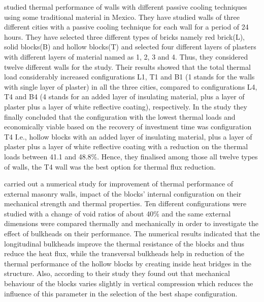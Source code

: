 \documentclass{article}
\begin{document}
\begin{multicols}{2}
\textcite{uriarte2019thermal} studied thermal performance of walls with different passive cooling techniques using some traditional material in Mexico. They have studied walls of three different cities with a passive cooling technique for each wall for a period of 24 hours. They have selected three different types of bricks namely red brick(L), solid blocks(B) and hollow blocks(T) and selected four different layers of plasters with different layers of material named as 1, 2, 3 and 4. Thus, they considered twelve different walls for the study. Their results showed that the total thermal load considerably increased configurations L1, T1 and B1 (1 stands for the walls with single layer of plaster) in all the three cities, compared to configurations L4, T4 and B4 (4 stands for an added layer of insulating material, plus a layer of plaster plus a layer of white reflective coating), respectively. In the study they finally concluded that the configuration with the lowest thermal loads and economically viable based on the recovery of investment time was configuration T4 I.e., hollow blocks with an added layer of insulating material, plus a layer of plaster plus a layer of white reflective coating with a reduction on the thermal loads between 41.1 and 48.8\%. Hence, they finalised among those all twelve types of walls, the T4 wall was the best option for thermal flux reduction.

\textcite{sassine2020investigation} carried out a numerical study for improvement of thermal performance of external masonry walls, impact of the blocks’ internal configuration on their mechanical strength and thermal properties. Ten different configurations were studied with a change of void ratios of about 40\% and the same external dimensions were compared thermally and mechanically in order to investigate the effect of bulkheads on their performance. The numerical results indicated that the longitudinal bulkheads improve the thermal resistance of the blocks and thus reduce the heat flux, while the transversal bulkheads help in reduction of the thermal performance of the hollow blocks by creating inside heat bridges in the structure. Also, according to their study they found out that mechanical behaviour of the blocks varies slightly in vertical compression which reduces the influence of this parameter in the selection of the best shape configuration.


\end{multicols}
\end{document}
